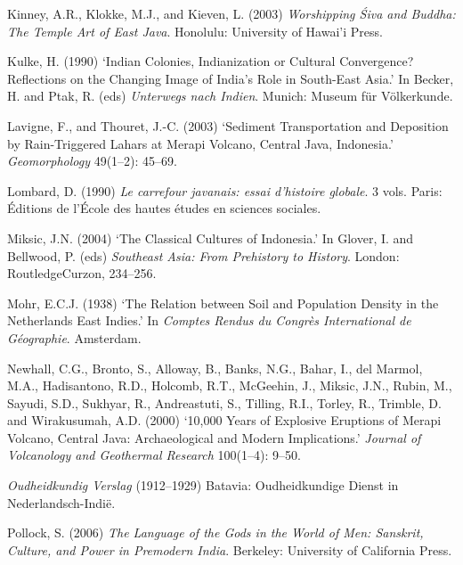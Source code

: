 \documentclass[12pt,a4paper]{article}
\begin{document}
\vspace{0.5em}
\noindent Kinney, A.R., Klokke, M.J., and Kieven, L. (2003) \emph{Worshipping \'{S}iva and Buddha: The Temple Art of East Java}. Honolulu: University of Hawai'i Press.

\vspace{0.5em}
\noindent Kulke, H. (1990) `Indian Colonies, Indianization or Cultural Convergence? Reflections on the Changing Image of India's Role in South-East Asia.' In Becker, H. and Ptak, R. (eds) \emph{Unterwegs nach Indien}. Munich: Museum f\"{u}r V\"{o}lkerkunde.

\vspace{0.5em}
\noindent Lavigne, F., and Thouret, J.-C. (2003) `Sediment Transportation and Deposition by Rain-Triggered Lahars at Merapi Volcano, Central Java, Indonesia.' \emph{Geomorphology} 49(1--2): 45--69.

\vspace{0.5em}
\noindent Lombard, D. (1990) \emph{Le carrefour javanais: essai d'histoire globale}. 3 vols. Paris: \'{E}ditions de l'\'{E}cole des hautes \'{e}tudes en sciences sociales.

\vspace{0.5em}
\noindent Miksic, J.N. (2004) `The Classical Cultures of Indonesia.' In Glover, I. and Bellwood, P. (eds) \emph{Southeast Asia: From Prehistory to History}. London: RoutledgeCurzon, 234--256.

\vspace{0.5em}
\noindent Mohr, E.C.J. (1938) `The Relation between Soil and Population Density in the Netherlands East Indies.' In \emph{Comptes Rendus du Congr\`{e}s International de G\'{e}ographie}. Amsterdam.

\vspace{0.5em}
\noindent Newhall, C.G., Bronto, S., Alloway, B., Banks, N.G., Bahar, I., del Marmol, M.A., Hadisantono, R.D., Holcomb, R.T., McGeehin, J., Miksic, J.N., Rubin, M., Sayudi, S.D., Sukhyar, R., Andreastuti, S., Tilling, R.I., Torley, R., Trimble, D. and Wirakusumah, A.D. (2000) `10,000 Years of Explosive Eruptions of Merapi Volcano, Central Java: Archaeological and Modern Implications.' \emph{Journal of Volcanology and Geothermal Research} 100(1--4): 9--50.

\vspace{0.5em}
\noindent \emph{Oudheidkundig Verslag} (1912--1929) Batavia: Oudheidkundige Dienst in Nederlandsch-Indi\"{e}.

\vspace{0.5em}
\noindent Pollock, S. (2006) \emph{The Language of the Gods in the World of Men: Sanskrit, Culture, and Power in Premodern India}. Berkeley: University of California Press.
\end{document}
